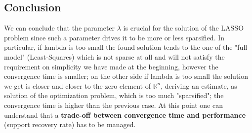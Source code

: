 \subsection*{Conclusion}
We can conclude that the parameter $\lambda$ is crucial for the solution of the LASSO problem since such a parameter drives it to be more or less sparsified. In particular, if lambda is too small the found solution tends to the one of the "full model" (Least-Squares) which is not sparse at all and will not satisfy the requirement on simplicity we have made at the beginning, however the convergence time is smaller; on the other side if lambda is too small the solution we get is closer and closer to the zero element of  $\mathbb{R}^n$, deriving an estimate, as solution of the optimization problem, which is too much "sparsified"; the convergence time is higher than the previous case. At this point one can understand that a \textbf{trade-off between convergence time and performance} (support recovery rate) has to be managed.



